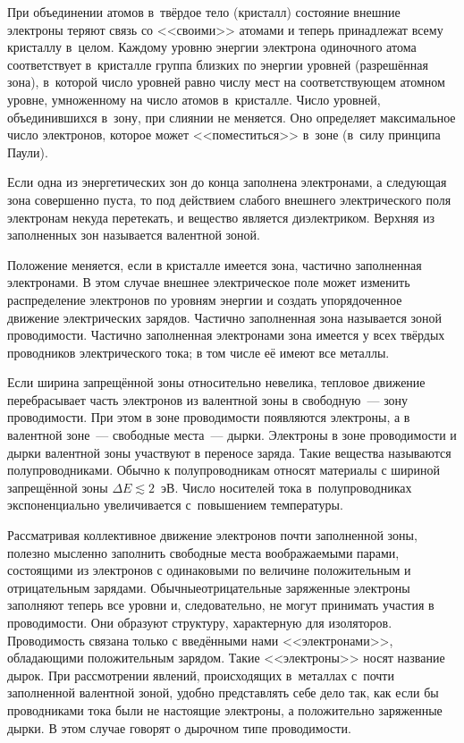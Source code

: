 При объединении атомов в~твёрдое тело (кристалл) состояние внешние электроны теряют связь со <<своими>> атомами и теперь принадлежат всему кристаллу в~целом. Каждому уровню энергии электрона одиночного атома соответствует в~кристалле группа близких по энергии уровней (разрешённая зона), в~которой число уровней равно числу мест на соответствующем атомном уровне, умноженному на число атомов в~кристалле. Число уровней, объединившихся в~зону, при слиянии не меняется. Оно определяет максимальное число электронов, которое может <<поместиться>> в~зоне (в~силу принципа Паули).

Если одна из энергетических зон до конца заполнена электронами, а следующая зона совершенно пуста, то под действием слабого внешнего электрического поля электронам некуда перетекать, и вещество является \textsf{диэлектриком}. Верхняя из заполненных зон называется {\textsf{валентной зоной}}.

Положение меняется, если в кристалле имеется зона, частично заполненная электронами. В этом случае внешнее электрическое поле может изменить распределение электронов по уровням энергии и создать упорядоченное движение электрических зарядов. Частично заполненная зона называется \textsf{зоной проводимости}. Частично заполненная электронами зона имеется у всех твёрдых проводников электрического тока; в том числе её имеют все металлы.

Если ширина запрещённой зоны относительно невелика, тепловое движение перебрасывает часть электронов из валентной зоны в свободную~--- зону проводимости. При этом в зоне проводимости появляются электроны, а в валентной зоне~--- свободные места~--- \textsf{дырки}. Электроны в зоне проводимости и дырки валентной зоны участвуют в переносе заряда. Такие вещества называются \textsf{полупроводниками}. Обычно к полупроводникам относят материалы с шириной запрещённой зоны $\Delta E \lesssim 2$~эВ. Число носителей тока в~полупроводниках экспоненциально увеличивается с~повышением температуры.

Рассматривая коллективное движение электронов почти заполненной зоны, полезно мысленно заполнить свободные места
воображаемыми парами, состоящими из электронов с одинаковыми по величине положительным и отрицательным зарядами. Обычныеотрицательные заряженные электроны заполняют теперь все уровни и, следовательно, не могут принимать участия в проводимости. Они образуют структуру, характерную для изоляторов. Проводимость связана только с введёнными нами
<<электронами>>, обладающими положительным зарядом. Такие <<электроны>> носят название \textsf{дырок}. При рассмотрении явлений, происходящих в~металлах с~почти заполненной валентной зоной, удобно представлять себе дело так, как если бы проводниками тока были не настоящие электроны, а положительно заряженные дырки. В этом случае говорят о \textsf{дырочном типе проводимости}.

